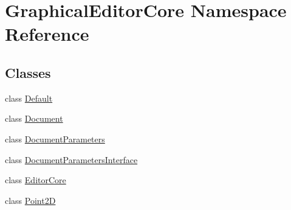 \hypertarget{namespaceGraphicalEditorCore}{}\section{Graphical\+Editor\+Core Namespace Reference}
\label{namespaceGraphicalEditorCore}
\subsection*{Classes}
\begin{DoxyCompactItemize}
\item 
class \hyperlink{classGraphicalEditorCore_1_1Default}{Default}
\item 
class \hyperlink{classGraphicalEditorCore_1_1Document}{Document}
\item 
class \hyperlink{classGraphicalEditorCore_1_1DocumentParameters}{Document\+Parameters}
\item 
class \hyperlink{classGraphicalEditorCore_1_1DocumentParametersInterface}{Document\+Parameters\+Interface}
\item 
class \hyperlink{classGraphicalEditorCore_1_1EditorCore}{Editor\+Core}
\item 
class \hyperlink{classGraphicalEditorCore_1_1Point2D}{Point2D}
\end{DoxyCompactItemize}
